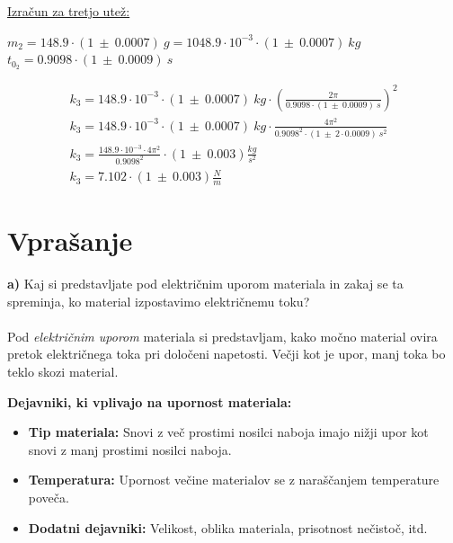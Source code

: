 \documentclass{report}
\begin{document}
\pagebreak

\noindent \underline{Izračun za tretjo utež:}

\noindent $m_2 = 148.9 \cdot (1 \ \pm \ 0.0007) \ g = 1048.9 \cdot 10^{-3} \cdot (1 \ \pm \ 0.0007) \ kg$ \\
$t_{0_2} = 0.9098 \cdot (1 \ \pm \ 0.0009) \ s$

\begin{equation}
  \label{eq:1}
  \begin{gathered}
    k_3 = 148.9 \cdot 10^{-3} \cdot (1 \ \pm \ 0.0007) \ kg \cdot \left(\frac{2 \pi}{0.9098 \cdot (1 \ \pm \ 0.0009) \ s}\right)^2 \\
    k_3 = 148.9 \cdot 10^{-3} \cdot (1 \ \pm \ 0.0007) \ kg \cdot \frac{4 {\pi}^2}{0.9098^2 \cdot (1 \ \pm \ 2 \cdot 0.0009) \ s^2} \\
    k_3 = \frac{148.9 \cdot 10^{-3} \cdot 4 {\pi}^2}{0.9098^2} \cdot (1 \ \pm \ 0.003) \frac{kg}{s^2} \\
    \boxed {k_3 = 7.102 \cdot (1 \ \pm \ 0.003) \frac{N}{m}}
  \end{gathered}
\end{equation}

\pagebreak

\section{Vprašanje}

\textbf{a)} Kaj si predstavljate pod električnim uporom materiala in zakaj se ta spreminja, ko material izpostavimo električnemu toku?
\\\\
\noindent
Pod \textit{električnim uporom} materiala si predstavljam, kako močno material ovira pretok električnega toka pri določeni napetosti. Večji kot je upor, manj toka bo teklo skozi material.

\textbf{Dejavniki, ki vplivajo na upornost materiala:}
\begin{itemize}
    \item \textbf{Tip materiala:} Snovi z več prostimi nosilci naboja imajo nižji upor kot snovi z manj prostimi nosilci naboja.
    \item \textbf{Temperatura:} Upornost večine materialov se z naraščanjem temperature poveča.
    \item \textbf{Dodatni dejavniki:} Velikost, oblika materiala, prisotnost nečistoč, itd.
\end{itemize}
\end{document}
